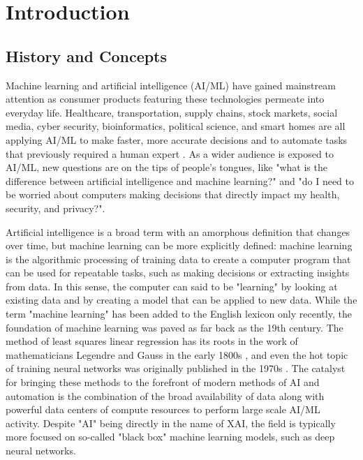 \section{Introduction}

\subsection{History and Concepts}

Machine learning and artificial intelligence (AI/ML) have gained mainstream attention as consumer products featuring these technologies permeate into everyday life.  Healthcare, transportation, supply chains, stock markets, social media, cyber security, bioinformatics, political science, and smart homes are all applying AI/ML to make faster, more accurate decisions and to automate tasks that previously required a human expert \cite{Shailaja2018MachineLI}\cite{Zhang2011}\cite{LU20171}\cite{HENRIQUE2019226}\cite{GHANI2018}\cite{Buczak2016ASO}\cite{Larraaga2006MachineLI}\cite{KAMILARIS201870}\cite{LAGO2019191}.  As a wider audience is exposed to AI/ML, new questions are on the tips of people's tongues, like "what is the difference between artificial intelligence and machine learning?" and "do I need to be worried about computers making decisions that directly impact my health, security, and privacy?".

Artificial intelligence is a broad term with an amorphous definition that changes over time, but machine learning can be more explicitly defined: machine learning is the algorithmic processing of training data to create a computer program that can be used for repeatable tasks, such as making decisions or extracting insights from data.  In this sense, the computer can said to be "learning" by looking at existing data and by creating a model that can be applied to new data.  While the term "machine learning" has been added to the English lexicon only recently, the foundation of machine learning was paved as far back as the 19th century.  The method of least squares linear regression has its roots in the work of mathematicians Legendre and Gauss in the early 1800s \cite{wiki:RegressionAnalysis}, and even the hot topic of training neural networks was originally published in the 1970s \cite{Werbos1974}.  The catalyst for bringing these methods to the forefront of modern methods of AI and automation is the combination of the broad availability of data along with powerful data centers of compute resources to perform large scale AI/ML activity.  Despite "AI" being directly in the name of XAI, the field is typically more focused on so-called "black box" machine learning models, such as deep neural networks.

